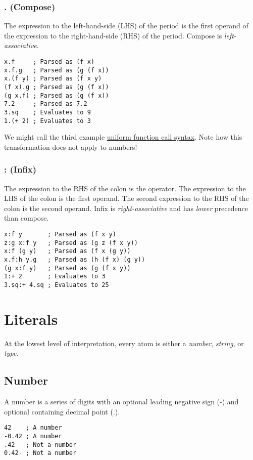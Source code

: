 \documentclass[twoside=false, numbers=noenddot]{scrbook}
\newcommand{\cref}[3]{\href{#1}{#2}\cite{#3}}
\begin{document}
\subsection{. (Compose)}
The expression to the left-hand-side (LHS) of the period is the first operand of the expression to the right-hand-side (RHS) of the period.
Compose is \emph{left-associative}.

\begin{verbatim}
x.f     ; Parsed as (f x)
x.f.g   ; Parsed as (g (f x))
x.(f y) ; Parsed as (f x y)
(f x).g ; Parsed as (g (f x))
(g x.f) ; Parsed as (g (f x))
7.2     ; Parsed as 7.2
3.sq    ; Evaluates to 9
1.(+ 2) ; Evaluates to 3
\end{verbatim}

We might call the third example \cref{http://www.drdobbs.com/cpp/uniform-function-call-syntax/232700394}{uniform function call syntax}{Bright:2012:UFC}.
Note how this transformation does not apply to numbers!

\subsection{: (Infix)}
The expression to the RHS of the colon is the operator.
The expression to the LHS of the colon is the first operand.
The second expression to the RHS of the colon is the second operand.
Infix is \emph{right-associative} and has \emph{lower} precedence than compose.

\begin{verbatim}
x:f y       ; Parsed as (f x y)
z:g x:f y   ; Parsed as (g z (f x y))
x:f (g y)   ; Parsed as (f x (g y))
x.f:h y.g   ; Parsed as (h (f x) (g y))
(g x:f y)   ; Parsed as (g (f x y))
1:+ 2       ; Evaluates to 3
3.sq:+ 4.sq ; Evaluates to 25
\end{verbatim}

\chapter{Literals}
At the lowest level of interpretation, every atom is either a \emph{number}, \emph{string}, or \emph{type}.

\section{Number}
A number is a series of digits with an optional leading negative sign (-) and optional containing decimal point (.).

\begin{verbatim}
42    ; A number
-0.42 ; A number
.42   ; Not a number
0.42- ; Not a number
\end{verbatim}
\end{document}
